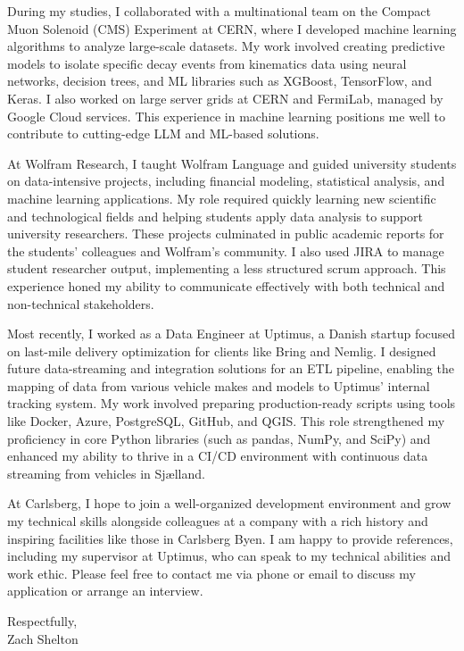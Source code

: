 \documentclass[11pt,a4]{article}
\begin{document}
During my studies, I collaborated with a multinational team on the Compact Muon Solenoid (CMS) Experiment at CERN, where I developed machine learning algorithms to analyze large-scale datasets. My work involved creating predictive models to isolate specific decay events from kinematics data using neural networks, decision trees, and ML libraries such as XGBoost, TensorFlow, and Keras. I also worked on large server grids at CERN and FermiLab, managed by Google Cloud services. This experience in machine learning positions me well to contribute to cutting-edge LLM and ML-based solutions.

At Wolfram Research, I taught Wolfram Language and guided university students on data-intensive projects, including financial modeling, statistical analysis, and machine learning applications. My role required quickly learning new scientific and technological fields and helping students apply data analysis to support university researchers. These projects culminated in public academic reports for the students' colleagues and Wolfram's community. I also used JIRA to manage student researcher output, implementing a less structured scrum approach. This experience honed my ability to communicate effectively with both technical and non-technical stakeholders.

Most recently, I worked as a Data Engineer at Uptimus, a Danish startup focused on last-mile delivery optimization for clients like Bring and Nemlig. I designed future data-streaming and integration solutions for an ETL pipeline, enabling the mapping of data from various vehicle makes and models to Uptimus' internal tracking system. My work involved preparing production-ready scripts using tools like Docker, Azure, PostgreSQL, GitHub, and QGIS. This role strengthened my proficiency in core Python libraries (such as pandas, NumPy, and SciPy) and enhanced my ability to thrive in a CI/CD environment with continuous data streaming from vehicles in Sjælland.

At Carlsberg, I hope to join a well-organized development environment and grow my technical skills alongside colleagues at a company with a rich history and inspiring facilities like those in Carlsberg Byen. I am happy to provide references, including my supervisor at Uptimus, who can speak to my technical abilities and work ethic. Please feel free to contact me via phone or email to discuss my application or arrange an interview.
\par

\vspace{0.5cm}
\raggedright
Respectfully, \\ 
Zach Shelton \\ 
\end{document}
